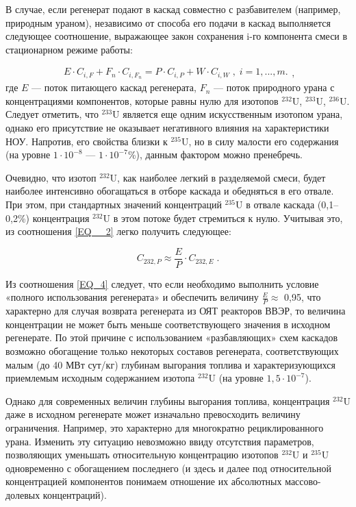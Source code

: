 В случае, если регенерат подают в каскад совместно с разбавителем (например, природным ураном), независимо от способа его подачи в каскад выполняется следующее соотношение, выражающее закон сохранения i-го компонента смеси в стационарном режиме работы:

\begin{equation} \label{EQ__2} 
  \begin{array}{l} {E \cdot C_{i,F}+F_n \cdot C_{i,F_n} =P \cdot C_{i,P} +W \cdot C_{i,W} \; ,\; i=1,...,m.} \end{array} ,
\end{equation} 
где $E$ --- поток питающего каскад регенерата, $F_n$ --- поток природного урана с концентрациями компонентов, которые равны нулю для изотопов $^{232}$U, $^{233}$U, $^{236}$U. Следует отметить, что $^{233}$U является еще одним искусственным изотопом урана, однако его присутствие не оказывает негативного влияния на характеристики НОУ. Напротив, его свойства близки к $^{235}$U, но в силу малости его содержания (на уровне $1\cdot10^{-8}$ --- $1\cdot10^{-7}$\%), данным фактором можно пренебречь.

Очевидно, что изотоп $^{232}$U, как наиболее легкий в разделяемой смеси, будет наиболее интенсивно обогащаться в отборе каскада и обедняться в его отвале. При этом, при стандартных значений концентраций $^{235}$U в отвале каскада (0,1--0,2\%) концентрация $^{232}$U в этом потоке будет стремиться к нулю. Учитывая это, из соотношения \ref{EQ__2} легко получить следующее:

\begin{equation}\label{EQ_4} 
  C_{232,P} \approx \frac{E}{P} \cdot C_{232,E} \; .
\end{equation}

Из соотношения \ref{EQ_4} следует, что если необходимо выполнить условие «полного использования регенерата» и обеспечить величину $\frac{E}{P}\approx$ 0,95, что характерно для случая возврата регенерата из ОЯТ реакторов ВВЭР, то величина концентрации не может быть меньше соответствующего значения в исходном регенерате. По этой причине с использованием «разбавляющих» схем каскадов возможно обогащение только некоторых составов регенерата, соответствующих малым (до 40 МВт сут/кг) глубинам выгорания топлива и характеризующихся приемлемым исходным содержанием изотопа $^{232}$U (на уровне $1,5\cdot10^{-7}$).

Однако для современных величин глубины выгорания топлива, концентрация $^{232}$U даже в исходном регенерате может изначально превосходить величину ограничения. Например, это характерно для многократно рециклированного урана. Изменить эту ситуацию невозможно ввиду отсутствия параметров, позволяющих уменьшать относительную концентрацию изотопов $^{232}$U и $^{235}$U одновременно с обогащением последнего (и здесь и далее под относительной концентрацией компонентов понимаем отношение их абсолютных массово-долевых концентраций).

